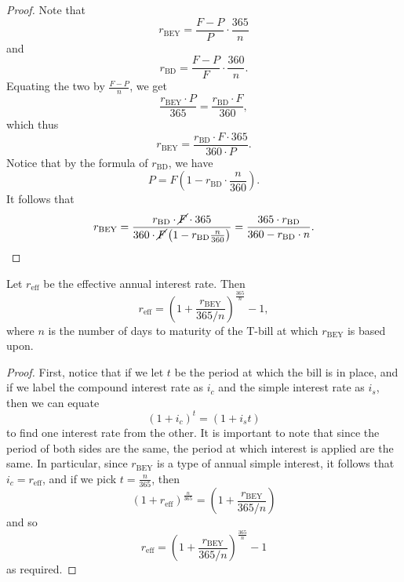 \documentclass[notoc,notitlepage]{tufte-book}
\DeclareMathOperator{\BEY}{BEY}
\DeclareMathOperator{\BD}{BD}
\DeclareMathOperator{\eff}{eff}
\begin{document}
\begin{proof}
  Note that
  \begin{equation*}
    r_{\BEY} = \frac{F - P}{P} \cdot \frac{365}{n}
  \end{equation*}
  and
  \begin{equation*}
    r_{\BD} = \frac{F - P}{F} \cdot \frac{360}{n}.
  \end{equation*}
  Equating the two by $\frac{F - P}{n}$, we get
  \begin{equation*}
    \frac{r_{\BEY} \cdot P}{365} = \frac{r_{\BD} \cdot F}{360},
  \end{equation*}
  which thus
  \begin{equation*}
    r_{\BEY} = \frac{r_{\BD} \cdot F \cdot 365}{360 \cdot P}.
  \end{equation*}
  Notice that by the formula of $r_{\BD}$, we have
  \begin{equation*}
    P = F \left( 1 - r_{\BD} \cdot \frac{n}{360} \right).
  \end{equation*}
  It follows that
  \begin{equation*}
    r_{\BEY} = \frac{r_{\BD} \cdot \cancel{F} \cdot 365}
            {360 \cdot \cancel{F} \left( 1 - r_{\BD} \frac{n}{360} \right)}
            = \frac{365 \cdot r_{\BD}}{360 - r_{\BD} \cdot n}.
  \end{equation*}
\end{proof}

\begin{propo}\label{propo:relationship_between_the_effective_annual_rate_and_the_bey}
  Let $r_{\eff}$ be the effective annual interest rate.
  Then
  \begin{equation*}
    r_{\eff} = \left( 1 + \frac{r_{\BEY}}{365 / n} \right)^{\frac{365}{n}} - 1,
  \end{equation*}
  where $n$ is the number of days to maturity of the T-bill
  at which $r_{\BEY}$ is based upon.
\end{propo}

\begin{proof}
  First, notice that if we let $t$ be the period at which the bill is in place,
  and if we label the compound interest rate as $i_c$ and the simple interest
  rate as $i_s$, then we can equate
  \begin{equation*}
    (1 + i_c)^t = (1 + i_s t)
  \end{equation*}
  to find one interest rate from the other.
  It is important to note that since the period of both sides are the same,
  the period at which interest is applied are the same.
  In particular, since $r_{\BEY}$ is a type of annual simple interest,
  it follows that $i_c = r_{\eff}$, and if we pick $t = \frac{n}{365}$, then
  \begin{equation*}
    (1 + r_{\eff})^{\frac{n}{365}} = (1 + \frac{r_{\BEY}}{365 / n})
  \end{equation*}
  and so
  \begin{equation*}
    r_{\eff} = \left( 1 + \frac{r_{\BEY}}{365 / n} \right)^{\frac{365}{n}} - 1
  \end{equation*}
  as required.
\end{proof}
\end{document}
